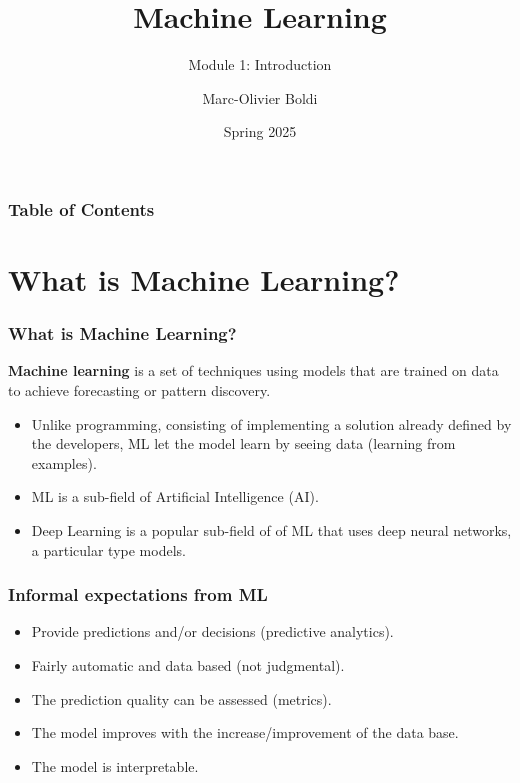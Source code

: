 
\title{Machine Learning}
\subtitle{Module 1: Introduction}
\author[MOB]{Marc-Olivier Boldi}
\date{Spring 2025}

\begin{frame}
	\titlepage
\end{frame}
\begin{frame}
\frametitle{Table of Contents}
	\tableofcontents
\end{frame}
\section{What is Machine Learning?}
\begin{frame}
\frametitle{What is Machine Learning?}
{\bf Machine learning} is a set of techniques using models that are trained on data to achieve forecasting or pattern discovery. 

\begin{itemize}
\item Unlike programming, consisting of implementing a solution already defined by the developers, ML let the model learn by seeing data (learning from examples). 
\item ML is a sub-field of Artificial Intelligence (AI).
\item Deep Learning is a popular sub-field of of ML that uses deep neural networks, a particular type models.
\end{itemize}
\end{frame}
\begin{frame}
\frametitle{Informal expectations from ML}
\begin{itemize}
\item Provide predictions and/or decisions (predictive analytics).
\item Fairly automatic and data based (not judgmental).
\item The prediction quality can be assessed (metrics).
\item The model improves with the increase/improvement of the data base.
\item The model is interpretable.
\end{itemize}
\end{frame}
